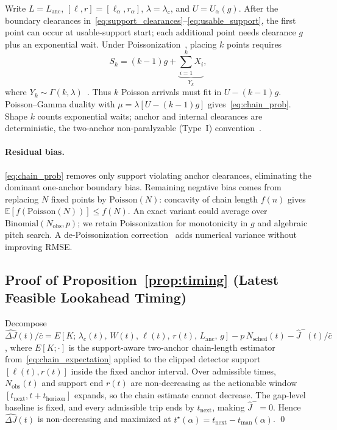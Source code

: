 Write $L=L_{\mathrm{anc}}$, $[\ell,r]=[\ell_\alpha,r_\alpha]$, $\lambda=\lambda_{\mathrm{c}}$, and $U=U_\alpha(g)$. After the boundary clearances in~\eqref{eq:support_clearances}--\eqref{eq:usable_support}, the first point can occur at usable-support start; each additional point needs clearance $g$ plus an exponential wait. Under Poissonization~\citep{jacquet_analytical_1998, feller_probability_1948}, placing $k$ points requires
\begin{equation}
S_k = (k{-}1)g + \underbrace{\sum_{i=1}^{k} X_i}_{Y_k},
\end{equation}
where $Y_k\sim\Gamma(k,\lambda)$~\citep{feller_introduction_1991}. Thus $k$ Poisson arrivals must fit in $U-(k{-}1)g$. Poisson--Gamma duality with $\mu=\lambda[U-(k{-}1)g]$ gives~\eqref{eq:chain_prob}. Shape $k$ counts exponential waits; anchor and internal clearances are deterministic, the two-anchor non-paralyzable (Type~I) convention~\citep{pyke_renewal_1958}.

\paragraph{Residual bias.}
\eqref{eq:chain_prob} removes only support violating anchor clearances, eliminating the dominant one-anchor boundary bias. Remaining negative bias comes from replacing $N$ fixed points by $\mathrm{Poisson}(N)$: concavity of chain length $f(n)$ gives $\mathbb{E}[f(\mathrm{Poisson}(N))]\leq f(N)$. An exact variant could average over $\mathrm{Binomial}(N_{\mathrm{obs}},p)$; we retain Poissonization for monotonicity in $g$ and algebraic pitch search. A de-Poissonization correction~\citep{jacquet_analytical_1998} adds numerical variance without improving RMSE.

\subsection{Proof of Proposition~\ref{prop:timing} (Latest Feasible Lookahead Timing)}

Decompose
$\widehat{\Delta J}(t)/\bar{c}
= E[K;\, \lambda_c(t),\, W(t),\, \ell(t),\, r(t),\, L_{\mathrm{anc}},\, g]
- p\, N_{\mathrm{sched}}(t)
- \hat{J}^-(t)/\bar{c}$,
where $E[K;\cdot]$ is the support-aware two-anchor chain-length estimator from~\eqref{eq:chain_expectation} applied to the clipped detector support $[\ell(t),r(t)]$ inside the fixed anchor interval.
Over admissible times, $N_{\mathrm{obs}}(t)$ and support end $r(t)$ are non-decreasing as the actionable window $[t_{\mathrm{next}},t+t_{\mathrm{horizon}}]$ expands, so the chain estimate cannot decrease. The gap-level baseline is fixed, and every admissible trip ends by $t_{\mathrm{next}}$, making $\hat{J}^-=0$. Hence $\widehat{\Delta J}(t)$ is non-decreasing and maximized at $t^\star(\alpha)=t_{\mathrm{next}}-t_{\mathrm{man}}(\alpha)$. \qed

